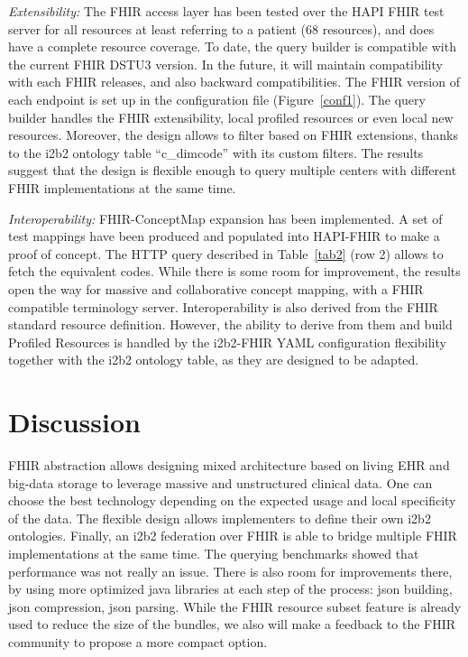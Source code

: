\documentclass{amia}
\begin{document}
\textit{Extensibility:} The FHIR access layer has been tested over the HAPI FHIR test server for all resources at least referring to a patient (68 resources), and does have a complete resource coverage. To date, the query builder is compatible with the current FHIR DSTU3 version. In the future, it will maintain compatibility with each FHIR releases, and also backward compatibilities. The FHIR version of each endpoint is set up in the configuration file (Figure~\ref{conf1}). The query builder handles the FHIR extensibility, local profiled resources or even local new resources. Moreover, the design allows to filter based on FHIR extensions, thanks to the i2b2 ontology table ``c\_dimcode'' with its custom filters. The results suggest that the design is flexible enough to query multiple centers with different FHIR implementations at the same time.

\textit{Interoperability: }FHIR-ConceptMap expansion has been implemented. A set of test mappings have been produced and populated into HAPI-FHIR to make a proof of concept. The HTTP query described in Table~\ref{tab2} (row 2)  allows to fetch the equivalent codes. While there is some room for improvement, the results open the way for massive and collaborative concept mapping, with a FHIR compatible terminology server. Interoperability is also derived from the FHIR standard resource definition. However, the ability to derive from them and build Profiled Resources is handled by the i2b2-FHIR YAML configuration flexibility together with the i2b2 ontology table, as they are designed to be adapted.

\section*{Discussion}

FHIR abstraction allows designing mixed architecture based on living EHR and big-data storage to leverage massive and unstructured clinical data. One can choose the best technology depending on the expected usage and local specificity of the data. The flexible design allows implementers to define their own i2b2 ontologies. Finally, an i2b2 federation over FHIR is able to bridge multiple FHIR implementations at the same time. The querying benchmarks showed that performance was not really an issue. There is also room for improvements there, by using more optimized java libraries at each step of the process: json building, json compression, json parsing. While the FHIR resource subset feature is already used to reduce the size of the bundles, we also will make a feedback to the FHIR community to propose a more compact option. 
\end{document}
